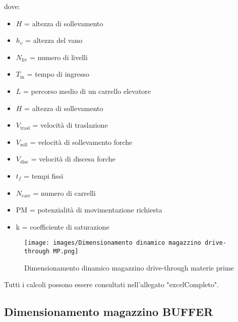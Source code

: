 \documentclass[11pt]{article}
\begin{document}
\noindent
dove:
\begin{itemize}
    \item $H$ = altezza di sollevamento
    \item $h_v$ = altezza del vano
    \item $N_\text{liv}$ = numero di livelli
    \item $T_\text{in}$ = tempo di ingresso
    \item $L$ = percorso medio di un carrello elevatore
    \item $H$ = altezza di sollevamento
    \item $V_\text{trasl}$ = velocità di traslazione
    \item $V_\text{soll}$ = velocità di sollevamento forche
    \item $V_\text{disc}$ = velocità di discesa forche
    \item $t_f$ = tempi fissi
    \item $N_\text{carr}$ = numero di carrelli
    \item PM = potenzialità di movimentazione richiesta
    \item k = coefficiente di saturazione
\end{itemize}

\begin{figure} [H]
    \centering
    \texttt{[image: images/Dimensionamento dinamico magazzino drive-through MP.png]}
    \caption{Dimensionamento dinamico magazzino drive-through materie prime}
    \label{fig: Dimensionamento dinamico magazzino drive-through MP}
\end{figure}

\noindent
Tutti i calcoli possono essere consultati nell'allegato "{{excelCompleto}}".
\newpage

\subsection{Dimensionamento magazzino BUFFER}
\end{document}
